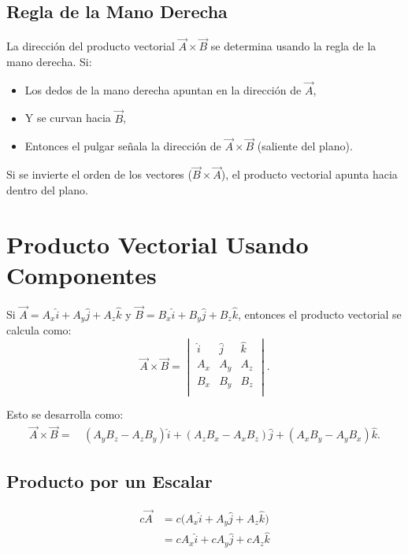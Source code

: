 \subsection{Regla de la Mano Derecha}
La dirección del producto vectorial $\vec{A} \times \vec{B}$ se determina usando la regla de la mano derecha. Si:
\begin{itemize}
    \item Los dedos de la mano derecha apuntan en la dirección de $\vec{A}$,
    \item Y se curvan hacia $\vec{B}$,
    \item Entonces el pulgar señala la dirección de $\vec{A} \times \vec{B}$ (saliente del plano).
\end{itemize}

Si se invierte el orden de los vectores ($\vec{B} \times \vec{A}$), el producto vectorial apunta hacia dentro del plano.

\begin{center}
\end{center}

\section{Producto Vectorial Usando Componentes}
Si $\vec{A} = A_x \hat{i} + A_y \hat{j} + A_z \hat{k}$ y $\vec{B} = B_x \hat{i} + B_y \hat{j} + B_z \hat{k}$, entonces el producto vectorial se calcula como:
\begin{equation}
    \vec{A} \times \vec{B} = \begin{vmatrix}
        \hat{i} & \hat{j} & \hat{k} \\
        A_x & A_y & A_z \\
        B_x & B_y & B_z \\
    \end{vmatrix}.
\end{equation}

Esto se desarrolla como:
\begin{align}
    \vec{A} \times \vec{B} = &\, (A_y B_z - A_z B_y) \hat{i} + (A_z B_x - A_x B_z) \hat{j} + (A_x B_y - A_y B_x) \hat{k}.
\end{align}

\subsection{Producto por un Escalar}
\begin{align*}
    c\vec{A} &= c\big(A_x\hat{i} + A_y\hat{j} + A_z\hat{k}\big) \\
             &= cA_x\hat{i} + cA_y\hat{j} + cA_z\hat{k}
\end{align*}